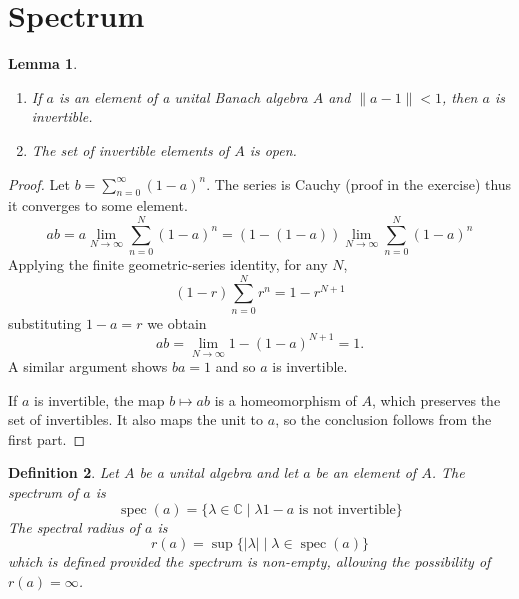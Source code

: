 \documentclass{book}
\newtheorem{definition}{Definition}[section]
\newtheorem{lemma}[definition]{Lemma}
\begin{document}
\section{Spectrum}
\begin{lemma}
  \begin{enumerate}
    \item If \(a\) is an element of a unital Banach algebra \(A\) and \(\|a-1\|<1\), then \(a\) is invertible.
    \item The set of invertible elements of \(A\) is open.
  \end{enumerate}
\end{lemma}
\begin{proof}
  Let \(b=\sum_{n=0}^{\infty}{(1-a)}^n\). The series is Cauchy (proof in the exercise) thus it converges to some element.
  \[
    ab=a\lim_{N\rightarrow\infty}\sum_{n=0}^{N}{(1-a)}^n=(1-(1-a))\lim_{N\rightarrow\infty}\sum_{n=0}^{N}{(1-a)}^n
  \]
  Applying the finite geometric-series identity, for any \(N\),
  \[
    (1-r)\sum_{n=0}^{N}r^n=1-r^{N+1}
  \]
  substituting \(1-a=r\) we obtain
  \[
    ab=\lim_{N\rightarrow\infty}1-{(1-a)}^{N+1}=1.
  \]
  A similar argument shows \(ba = 1\) and so \(a\) is invertible.\par
  If \(a\) is invertible, the map \(b \mapsto ab\) is a homeomorphism of \(A\), which
  preserves the set of invertibles. It also maps the unit to \(a\), so the conclusion
  follows from the first part.
\end{proof}
\begin{definition}
  Let \(A\) be a unital algebra and let \(a\) be an element of \(A\). The \textnormal{spectrum} of \(a\) is 
  \[
    \operatorname{spec}(a) = \{\lambda\in\mathbb{C}\mid\lambda 1-a\text{ is not invertible}\}
  \]
  The \textnormal{spectral radius} of \(a\) is
  \[
    r(a)=\sup\{\left\lvert \lambda\right\rvert \mid\lambda\in \operatorname{spec}(a)\}
  \]
  which is defined provided the spectrum is non-empty, allowing the possibility of \(r(a)=\infty\).
\end{definition}
\end{document}
